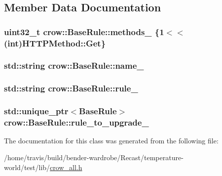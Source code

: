 \subsection{Member Data Documentation}
\hypertarget{classcrow_1_1_base_rule_a997e9942d597fe133df84c94558c1e13}{
\subsubsection[{methods\-\_\-}]{\setlength{\rightskip}{0pt plus 5cm}uint32\-\_\-t crow\-::\-Base\-Rule\-::methods\-\_\- \{1$<$$<$(int){\bf H\-T\-T\-P\-Method\-::\-Get}\}\hspace{0.3cm}{\ttfamily [protected]}}}\label{classcrow_1_1_base_rule_a997e9942d597fe133df84c94558c1e13}
\hypertarget{classcrow_1_1_base_rule_a34d579887fac170e179e9e69eac3d771}{
\subsubsection[{name\-\_\-}]{\setlength{\rightskip}{0pt plus 5cm}std\-::string crow\-::\-Base\-Rule\-::name\-\_\-\hspace{0.3cm}{\ttfamily [protected]}}}\label{classcrow_1_1_base_rule_a34d579887fac170e179e9e69eac3d771}
\hypertarget{classcrow_1_1_base_rule_a39f73fef34a8ff67907d96ef9c92b35a}{
\subsubsection[{rule\-\_\-}]{\setlength{\rightskip}{0pt plus 5cm}std\-::string crow\-::\-Base\-Rule\-::rule\-\_\-\hspace{0.3cm}{\ttfamily [protected]}}}\label{classcrow_1_1_base_rule_a39f73fef34a8ff67907d96ef9c92b35a}
\hypertarget{classcrow_1_1_base_rule_aa08be2b793fe80d462f71c064a9949b8}{
\subsubsection[{rule\-\_\-to\-\_\-upgrade\-\_\-}]{\setlength{\rightskip}{0pt plus 5cm}std\-::unique\-\_\-ptr$<${\bf Base\-Rule}$>$ crow\-::\-Base\-Rule\-::rule\-\_\-to\-\_\-upgrade\-\_\-\hspace{0.3cm}{\ttfamily [protected]}}}\label{classcrow_1_1_base_rule_aa08be2b793fe80d462f71c064a9949b8}


The documentation for this class was generated from the following file\-:\begin{DoxyCompactItemize}
\item 
/home/travis/build/bender-\/wardrobe/\-Recast/temperature-\/world/test/lib/\hyperlink{crow__all_8h}{crow\-\_\-all.\-h}\end{DoxyCompactItemize}
